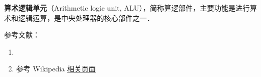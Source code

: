 
\begin{issues}
\issueDraft
\end{issues}

\textbf{算术逻辑单元}（Arithmetic logic unit, ALU），简称算逻部件，主要功能是进行算术和逻辑运算，是中央处理器的核心部件之一．

参考文献：
\begin{enumerate}
\item \cite{唐计}
\item 参考 Wikipedia \href{https://en.wikipedia.org/wiki/Arithmetic_logic_unit}{相关页面}
\end{enumerate}
